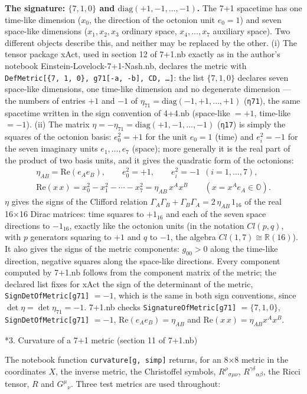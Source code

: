 \documentclass[10pt,a4paper]{article}
\makeatletter
\renewcommand\section{\@startsection{section}{1}{\z@}{-3.5ex \@plus -1ex \@minus -.2ex}{2.3ex \@plus.2ex}{\normalfont\Large\bfseries\raggedright}}
\makeatother
\begin{document}
\textbf{The signature: $\{7,1,0\}$ and $\mathrm{diag}(+1,-1,\dots,-1)$.} The 7+1 spacetime has one time-like dimension ($x_0$, the direction of the octonion unit $e_0=1$) and seven space-like dimensions ($x_1,x_2,x_3$ ordinary space, $x_4,\dots,x_7$ auxiliary space). Two different objects describe this, and neither may be replaced by the other. (i) The tensor package xAct, used in section 12 of 7+1.nb exactly as in the author’s notebook Einstein-Lovelock-7+1-Nash.nb, declares the metric with \texttt{DefMetric[\{7, 1, 0\}, g71[-a, -b], CD, …]}: the list $\{7,1,0\}$ declares seven space-like dimensions, one time-like dimension and no degenerate dimension — the numbers of entries $+1$ and $-1$ of $\eta_{71}=\mathrm{diag}(-1,+1,\dots,+1)$ (\texttt{η71}), the same spacetime written in the sign convention of 4+4.nb (space-like $=+1$, time-like $=-1$). (ii) The matrix $\eta=-\eta_{71}=\mathrm{diag}(+1,-1,\dots,-1)$ (\texttt{η17}) is simply the squares of the octonion basis: $e_0^2=+1$ for the unit $e_0=1$ (time) and $e_i^2=-1$ for the seven imaginary units $e_1,\dots,e_7$ (space); more generally it is the real part of the product of two basis units, and it gives the quadratic form of the octonions:
\begin{gather*}
\eta_{AB}=\mathrm{Re}(e_Ae_B),\qquad e_0^2=+1,\qquad e_i^2=-1\ \ (i=1,\dots,7),\\ \mathrm{Re}(x\,x)=x_0^2-x_1^2-\cdots-x_7^2=\eta_{AB}\,x^Ax^B\qquad (x=x^Ae_A\in\mathbb O).
\end{gather*}
$\eta$ gives the signs of the Clifford relation $\Gamma_A\Gamma_B+\Gamma_B\Gamma_A=2\,\eta_{AB}\,1_{16}$ of the real 16×16 Dirac matrices: time squares to $+1_{16}$ and each of the seven space directions to $-1_{16}$, exactly like the octonion units (in the notation $Cl(p,q)$, with $p$ generators squaring to $+1$ and $q$ to $-1$, the algebra $Cl(1,7)\cong\mathbb R(16)$). It also gives the signs of the metric components: $g_{00}>0$ along the time-like direction, negative squares along the space-like directions. Every component computed by 7+1.nb follows from the component matrix of the metric; the declared list fixes for xAct the sign of the determinant of the metric, \texttt{SignDetOfMetric[g71]} $=-1$, which is the same in both sign conventions, since $\det \eta=\det \eta_{71}=-1$. 7+1.nb checks \texttt{SignatureOfMetric[g71]} $=\{7,1,0\}$, \texttt{SignDetOfMetric[g71]} $=-1$, $\mathrm{Re}(e_Ae_B)=\eta_{AB}$ and $\mathrm{Re}(x\,x)=\eta_{AB}x^Ax^B$.

\section*{3. Curvature of a 7+1 metric (section 11 of 7+1.nb)}
The notebook function \texttt{curvature[g, simp]} returns, for an 8×8 metric in the coordinates $X$, the inverse metric, the Christoffel symbols, $R^\rho{}_{\sigma\mu\nu}$, $R^{\gamma\delta}{}_{\alpha\beta}$, the Ricci tensor, $R$ and $G^\mu{}_\nu$. Three test metrics are used throughout:
\end{document}
